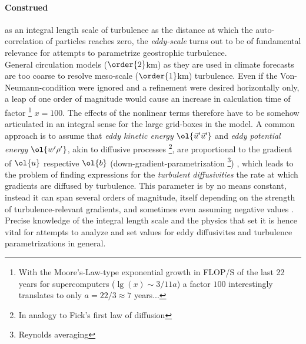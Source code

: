 \paragraph{Construed} as an integral length scale of turbulence \ie as the distance at which the auto-correlation of particles reaches zero, the \emph{eddy-scale} turns out to be of fundamental relevance for attempts to parametrize geostrophic turbulence.\\
General circulation models ($\order{2}$km) as they are used in \eg climate forecasts are too coarse to resolve meso-scale ($\order{1}$km) turbulence. Even if the Von-Neumann-condition were ignored and a refinement were desired horizontally only, a leap of one order of magnitude would cause an increase in calculation time of factor \footnote{With the Moore's-Law-type exponential growth in FLOP/S of the last 22 years for supercomputers ($\lg(x)\sim 3/11 a$) a factor $100$ interestingly translates to only $a=22/3\approx 7$ years...} $x=100$.  The effects of the nonlinear terms therefore have to be somehow articulated in an integral sense for the large grid-boxes in the model.
A common approach is to assume that \textit{eddy kinetic energy} $\ol{ \vec{u}'\vec{u}'}$ and \textit{eddy potential energy} $\ol{  w'\rho'}$, akin to diffusive
processes \footnote{In analogy to Fick's first law of diffusion}, are proportional to the gradient of $\ol{u}$ respective $\ol{b}$
(down-gradient-parametrization \footnote{\ie Reynolds averaging}) \citep*{olbers2012ocean}, which leads to the problem of finding expressions for the
\textit{turbulent diffusivities} \ie the rate at which gradients are diffused by turbulence. This parameter is by no means constant, instead it can span
several orders of magnitude, itself depending on the strength of turbulence-relevant gradients, and sometimes even assuming negative values
\citep{eden2008towards}. Precise knowledge of the integral length scale and the physics that set it is hence vital for attempts to analyze and set values for
eddy diffusivites and turbulence parametrizations in general.



